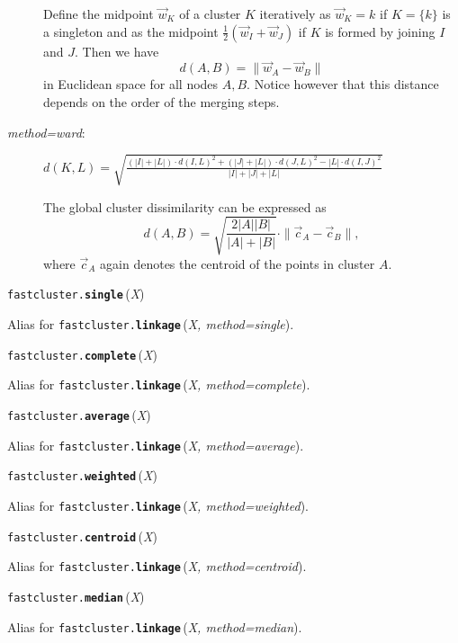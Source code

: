 \documentclass[fontsize=10pt,paper=letter,BCOR=-6mm,DIV=8]{scrartcl}
\makeatletter
\newcommand*\q{\textquotesingle}
\newenvironment{methods}{%
  \list{}{\labelwidth\z@
    \itemindent-\leftmargin
    \let\makelabel\methodslabel}%
}{%
  \endlist
}
\newcommand*{\methodslabel}[1]{%
  \hbox to \textwidth{\hspace{\labelsep}%
  \normalfont\bfseries\ttfamily
  #1\hskip-\labelsep\hfill}%
}
\makeatother
\begin{document}
\begin{methods}
\begin{description}
Define the midpoint $\vec w_K$ of a cluster $K$ iteratively as $\vec w_K=k$ if $K=\{k\}$ is a singleton and as the midpoint $\frac12(\vec w_I+\vec w_J)$ if $K$ is formed by joining $I$ and $J$. Then we have
\[
 d(A,B)=\|\vec w_A-\vec w_B\|
\]
in Euclidean space for all nodes $A,B$. Notice however that this distance depends on the order of the merging steps.

\item [\normalfont\textit{method=\q ward\q}:] \raggedright
$\displaystyle d(K,L) = \sqrt{\frac{(|I|+|L|)\cdot d(I,L)^2+(|J|+|L|)\cdot d(J,L)^2-|L|\cdot d(I,J)^2}{|I|+|J|+|L|}}$

The global cluster dissimilarity can be expressed as
\[
d(A,B)=\sqrt{\frac{2|A||B|}{|A|+|B|}}\cdot\|\vec c_A-\vec c_B\|,
\]
where $\vec c_A$ again denotes the centroid of the points in cluster $A$.
\end{description}

\item [\normalfont\texttt{fastcluster.\textbf{single}}\,(\textit{X})]
\label{single}
Alias for \texttt{fastcluster.\textbf{linkage}}\,(\textit{X, method=\q single\q}).

\item [\normalfont\texttt{fastcluster.\textbf{complete}}\,(\textit{X})]
\label{complete}
Alias for \texttt{fastcluster.\textbf{linkage}}\,(\textit{X, method=\q complete\q}).

\item [\normalfont\texttt{fastcluster.\textbf{average}}\,(\textit{X})]
\label{average}
Alias for \texttt{fastcluster.\textbf{linkage}}\,(\textit{X, method=\q average\q}).

\item [\normalfont\texttt{fastcluster.\textbf{weighted}}\,(\textit{X})]
\label{weighted}
Alias for \texttt{fastcluster.\textbf{linkage}}\,(\textit{X, method=\q weighted\q}).

\item [\normalfont\texttt{fastcluster.\textbf{centroid}}\,(\textit{X})]
\label{centroid}
Alias for \texttt{fastcluster.\textbf{linkage}}\,(\textit{X, method=\q centroid\q}).

\item [\normalfont\texttt{fastcluster.\textbf{median}}\,(\textit{X})]
\label{median}
Alias for \texttt{fastcluster.\textbf{linkage}}\,(\textit{X, method=\q median\q}).


\end{methods}
\end{document}
